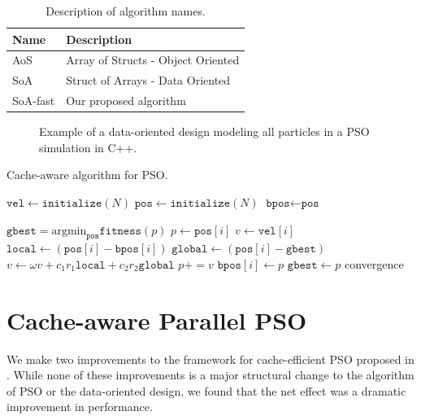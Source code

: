 \begin{table}
  \centering
  \caption{Description of algorithm names.}
  \label{tab:names}
  \begin{tabular}{ll}\toprule
    \textbf{Name} & \textbf{Description}\\\midrule
    AoS & Array of Structs - Object Oriented\\
    SoA & Struct of Arrays - Data Oriented\\
    SoA-fast & Our proposed algorithm\\\bottomrule
  \end{tabular}
\end{table}

          

\begin{figure}
  
  \caption{Example of a data-oriented design modeling all particles in a PSO
    simulation in C++.}\label{fig:particles}
\end{figure}

\begin{algorithm}
  \caption{Cache-aware algorithm for PSO.}\label{alg:pso-cache}
  \begin{algorithmic}[1]
    \State $\texttt{vel} \gets \texttt{initialize}(N)$ 
    \State $\texttt{pos} \gets \texttt{initialize}(N)$ 
    \State $\texttt{bpos} \gets \texttt{pos}$ 

    \Repeat
    \State $\texttt{gbest} = \text{argmin}_{\texttt{pos}}\texttt{fitness}(p)$
    \State $p \gets \texttt{pos}[i]$
    \State $v \gets \texttt{vel}[i]$
    \State $\texttt{local} \gets (\texttt{pos}[i] -
    \texttt{bpos}[i])$
    \State $\texttt{global} \gets  (\texttt{pos}[i]
    - \texttt{gbest})$
    \State $v \gets \omega v + c_1 r_1 \texttt{local}  + c_2 r_2 \texttt{global}$
    \State $p += v$
      \State $\texttt{bpos}[i] \gets p$
      \State $\texttt{gbest} \gets p$
      \EndIf
    \EndIf
    \EndFor
    \Until convergence
    \EndProcedure
  \end{algorithmic}
\end{algorithm}

\section{Cache-aware Parallel PSO}\label{sec:algo}
We make two improvements to the framework for cache-efficient PSO proposed
in \cite{cache-pso}. While none of these improvements is a major structural
change to the algorithm of PSO or the data-oriented design, we found that the
net effect was a dramatic improvement in performance.

